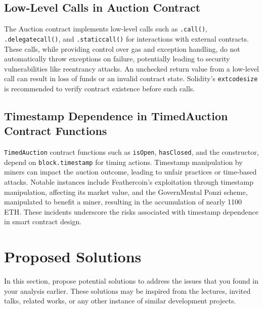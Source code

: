 \documentclass[conference]{IEEEtran}
\begin{document}
\subsection{Low-Level Calls in Auction Contract}
The Auction contract implements low-level calls such as \texttt{.call()}, \texttt{.delegatecall()}, and \texttt{.staticcall()} for interactions with external contracts. These calls, while providing control over gas and exception handling, do not automatically throw exceptions on failure, potentially leading to security vulnerabilities like reentrancy attacks. An unchecked return value from a low-level call can result in loss of funds or an invalid contract state. Solidity's \texttt{extcodesize} is recommended to verify contract existence before such calls\cite{zipfel2023lowlevelcall}.


\subsection{Timestamp Dependence in TimedAuction Contract Functions}
\texttt{TimedAuction} contract functions such as \texttt{isOpen}, \texttt{hasClosed}, and the constructor, depend on \texttt{block.timestamp} for timing actions. Timestamp manipulation by miners can impact the auction outcome, leading to unfair practices or time-based attacks. Notable instances include Feathercoin's exploitation through timestamp manipulation, affecting its market value, and the GovernMental Ponzi scheme, manipulated to benefit a miner, resulting in the accumulation of nearly 1100 ETH. These incidents underscore the risks associated with timestamp dependence in smart contract design\cite{neptunemutual2023timestamp}.



\section{Proposed Solutions}
In this section, propose potential solutions to address the issues that you found in your analysis earlier. These solutions may be inspired from the lectures, invited talks, related works, or any other instance of similar development projects. 


    
\end{document}
